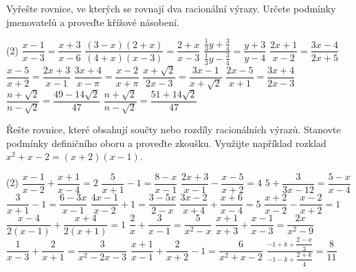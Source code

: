 \documentclass[12pt,a4paper]{article}
\begin{document}
\begin{exercise}
  Vyřešte rovnice, ve kterých se rovnají dva racionální výrazy.  
  Určete podmínky jmenovatelů a proveďte křížové násobení.
  \begin{tasks}(2)
    \task \(\dfrac{x - 1}{x - 3} = \dfrac{x + 3}{x - 6}\)
    \task \(\dfrac{(3 - x)(2 + x)}{(4 + x)(x - 3)} = \dfrac{2 + x}{x - 3}\)
    \task \(\dfrac{\tfrac{1}{3}y + \tfrac{3}{4}}{\tfrac{1}{3}y - \tfrac{3}{4}} = \dfrac{y + 3}{y - 4}\)
    \task \(\dfrac{2x + 1}{x - 2} = \dfrac{3x - 4}{2x + 5}\)
    \task \(\dfrac{x - 5}{x + 2} = \dfrac{2x + 3}{x - 1}\)
    \task \(\dfrac{3x + 4}{x - \pi} = \dfrac{x - 2}{x + \pi}\)
    \task \(\dfrac{x + \sqrt{2}}{2x - 3} = \dfrac{3x - 1}{x + \sqrt{2}}\)
    \task \(\dfrac{2x - 5}{x + 1} = \dfrac{3x + 4}{2x - 3}\)
    \task \(\dfrac{n + \sqrt{2}}{n - \sqrt{2}} = \dfrac{49 - 14\sqrt{2}}{47}\)
    \task \(\dfrac{n + \sqrt{2}}{n - \sqrt{2}} = \dfrac{51 + 14\sqrt{2}}{47}\)
  \end{tasks}
\end{exercise}



\begin{exercise}
  Řešte rovnice, které obsahují součty nebo rozdíly racionálních výrazů.  
  Stanovte podmínky definičního oboru a proveďte zkoušku.  
  Využijte například rozklad \(x^{2} + x - 2 = (x + 2)(x - 1)\).
  \begin{tasks}(2)
    \task \(\dfrac{x - 1}{x - 2} + \dfrac{x + 1}{x - 4} = 2\)
    \task $\dfrac{5}{x+1} - 1 = \dfrac{8-x}{x-1}$
    \task \(\dfrac{2x + 3}{x - 1} - \dfrac{x - 5}{x + 2} = 4\)
    \task $5 + \dfrac{3}{3x-12} = \dfrac{5-x}{x-4}$
    \task $\dfrac{3}{x+1} - 1 = \dfrac{6-3x}{x-1}$
    \task $\dfrac{4x-1}{x-2} + 1 = \dfrac{3-5x}{2-x}$
    \task \(\dfrac{3x - 2}{x + 4} + \dfrac{x + 6}{x - 4} = 5\)
    \task \(\dfrac{x + 2}{x - 2} - \dfrac{x - 2}{x + 2} = 1\)
    \task $\dfrac{x-4}{2(x-1)} + \dfrac{x+4}{2(x+1)} = 1$
    \task \(\dfrac{2}{x} + \dfrac{3}{x - 1} = \dfrac{5}{x^{2} - x}\)
    \task \(\dfrac{x + 1}{x + 3} + \dfrac{x - 1}{x - 3} = \dfrac{2x}{x^{2} - 9}\)
    \task \(\dfrac{1}{x - 3} + \dfrac{2}{x + 1} = \dfrac{3}{x^{2} - 2x - 3}\)  
    \task \(\dfrac{x + 1}{x - 1} + \dfrac{2}{x + 2} - 1 = \dfrac{6}{x^{2} + x - 2}\)  
    \task $\frac{-1 + k + \dfrac{2 - x}{3}}{-1 - k + \dfrac{2 + k}{4}} = \dfrac{8}{11}$
  \end{tasks}
\end{exercise}
\end{document}
